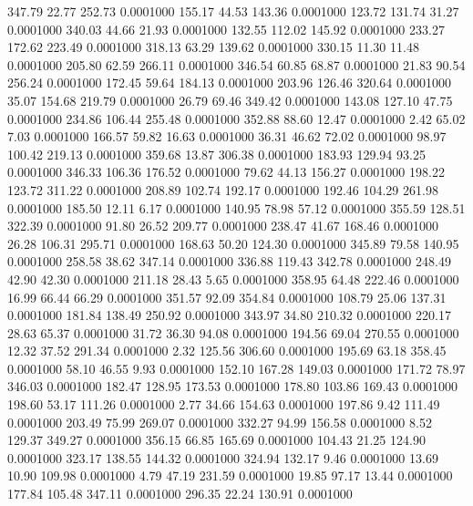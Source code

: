  347.79   22.77  252.73   0.0001000
 155.17   44.53  143.36   0.0001000
 123.72  131.74   31.27   0.0001000
 340.03   44.66   21.93   0.0001000
 132.55  112.02  145.92   0.0001000
 233.27  172.62  223.49   0.0001000
 318.13   63.29  139.62   0.0001000
 330.15   11.30   11.48   0.0001000
 205.80   62.59  266.11   0.0001000
 346.54   60.85   68.87   0.0001000
  21.83   90.54  256.24   0.0001000
 172.45   59.64  184.13   0.0001000
 203.96  126.46  320.64   0.0001000
  35.07  154.68  219.79   0.0001000
  26.79   69.46  349.42   0.0001000
 143.08  127.10   47.75   0.0001000
 234.86  106.44  255.48   0.0001000
 352.88   88.60   12.47   0.0001000
   2.42   65.02    7.03   0.0001000
 166.57   59.82   16.63   0.0001000
  36.31   46.62   72.02   0.0001000
  98.97  100.42  219.13   0.0001000
 359.68   13.87  306.38   0.0001000
 183.93  129.94   93.25   0.0001000
 346.33  106.36  176.52   0.0001000
  79.62   44.13  156.27   0.0001000
 198.22  123.72  311.22   0.0001000
 208.89  102.74  192.17   0.0001000
 192.46  104.29  261.98   0.0001000
 185.50   12.11    6.17   0.0001000
 140.95   78.98   57.12   0.0001000
 355.59  128.51  322.39   0.0001000
  91.80   26.52  209.77   0.0001000
 238.47   41.67  168.46   0.0001000
  26.28  106.31  295.71   0.0001000
 168.63   50.20  124.30   0.0001000
 345.89   79.58  140.95   0.0001000
 258.58   38.62  347.14   0.0001000
 336.88  119.43  342.78   0.0001000
 248.49   42.90   42.30   0.0001000
 211.18   28.43    5.65   0.0001000
 358.95   64.48  222.46   0.0001000
  16.99   66.44   66.29   0.0001000
 351.57   92.09  354.84   0.0001000
 108.79   25.06  137.31   0.0001000
 181.84  138.49  250.92   0.0001000
 343.97   34.80  210.32   0.0001000
 220.17   28.63   65.37   0.0001000
  31.72   36.30   94.08   0.0001000
 194.56   69.04  270.55   0.0001000
  12.32   37.52  291.34   0.0001000
   2.32  125.56  306.60   0.0001000
 195.69   63.18  358.45   0.0001000
  58.10   46.55    9.93   0.0001000
 152.10  167.28  149.03   0.0001000
 171.72   78.97  346.03   0.0001000
 182.47  128.95  173.53   0.0001000
 178.80  103.86  169.43   0.0001000
 198.60   53.17  111.26   0.0001000
   2.77   34.66  154.63   0.0001000
 197.86    9.42  111.49   0.0001000
 203.49   75.99  269.07   0.0001000
 332.27   94.99  156.58   0.0001000
   8.52  129.37  349.27   0.0001000
 356.15   66.85  165.69   0.0001000
 104.43   21.25  124.90   0.0001000
 323.17  138.55  144.32   0.0001000
 324.94  132.17    9.46   0.0001000
  13.69   10.90  109.98   0.0001000
   4.79   47.19  231.59   0.0001000
  19.85   97.17   13.44   0.0001000
 177.84  105.48  347.11   0.0001000
 296.35   22.24  130.91   0.0001000
